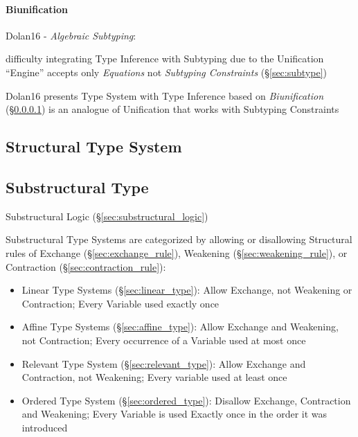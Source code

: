 \paragraph{Biunification}\label{sec:biunification}\hfill

Dolan16 - \emph{Algebraic Subtyping}:

difficulty integrating Type Inference with Subtyping due to the
Unification ``Engine'' accepts only \emph{Equations} not
\emph{Subtyping Constraints} (\S\ref{sec:subtype})

Dolan16 presents Type System with Type Inference based on
\emph{Biunification} (\S\ref{sec:biunification}) is an analogue of
Unification that works with Subtyping Constraints



\subsection{Structural Type System}\label{sec:structural_type_system}

\subsection{Substructural Type}
\label{sec:substructural_type}

Substructural Logic (\S\ref{sec:substructural_logic})

Substructural Type Systems are categorized by allowing or disallowing
Structural rules of Exchange (\S\ref{sec:exchange_rule}), Weakening
(\S\ref{sec:weakening_rule}), or Contraction
(\S\ref{sec:contraction_rule}):

\begin{itemize}
  \item Linear Type Systems (\S\ref{sec:linear_type}): Allow Exchange,
    not Weakening or Contraction; Every Variable used exactly once
  \item Affine Type Systems (\S\ref{sec:affine_type}): Allow Exchange
    and Weakening, not Contraction; Every occurrence of a Variable
    used at most once
  \item Relevant Type System (\S\ref{sec:relevant_type}): Allow
    Exchange and Contraction, not Weakening; Every variable used at
    least once
  \item Ordered Type System (\S\ref{sec:ordered_type}): Disallow
    Exchange, Contraction and Weakening; Every Variable is used
    Exactly once in the order it was introduced
\end{itemize}

